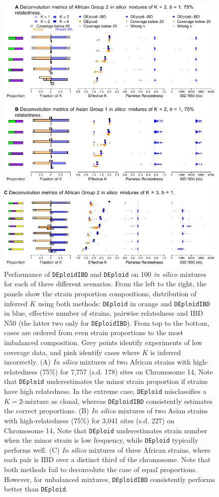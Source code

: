 \documentclass[9pt,lineno]{elife}
\begin{document}
\begin{figure}[htp]
  \begin{center}
  \includegraphics[width=.9\textwidth]{Fig2_validation_updated.pdf}
  \caption{Performance of \texttt{DEploidIBD} and \texttt{DEploid} on 100 {\it in silico} mixtures for each of three different scenarios. From the left to the right, the panels show the strain proportion compositions, distribution of inferred $K$ using both methods: {\tt DEploid} in orange and {\tt DEploidIBD} in blue, effective number of strains, pairwise relatedness and IBD N50 (the latter two only for {\tt DEploidIBD}). From top to the bottom, cases are ordered from even strain proportions to the most imbalanced composition. Grey points identify experiments of low coverage data, and pink identify cases where $K$ is inferred incorrectly. (A) {\it In silico}  mixtures of two African strains with high-relatedness (75\%) for 7,757 (s.d. 178) sites on Chromosome 14, Note that {\tt DEploid} underestimates the minor strain proportion if strains have high relatedness. In the extreme case, {\tt DEploid} misclassifies a $K=2$-mixture as clonal, whereas {\tt DEploidIBD} consistently estimates the correct proportions. (B)  {\it In silico}  mixtures of two Asian strains with high-relatedness (75\%) for 3,041 sites (s.d. 227) on Chromosome 14, Note that {\tt DEploid} underestimates strain number when the minor strain is low frequency, while  {\tt DEploid} typically performs well. (C)  {\it In silico} mixtures of three African strains, where each pair is IBD over a distinct third of the chromosome. Note that both methods fail to deconvolute the case of equal proportions. However, for unbalanced mixtures, {\tt DEploidIBD} consistently performs better than {\tt DEploid}.
  }\label{fig:benchmark}
  \end{center}

\setcounter{fig2Counter}{\value{enumi}}
\end{figure}
\end{document}
